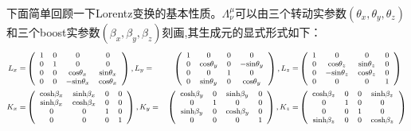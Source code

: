 下面简单回顾一下Lorentz变换的基本性质。$\Lambda^{\mu}_{\nu}$可以由三个转动实参数$(\theta_{x},\theta_{y},\theta_{z})$和三个boost实参数$(\beta_{x},\beta_{y},\beta_{z})$刻画,其生成元的显式形式如下：
\begin{equation}
\label{Lorentzgenerator}
\footnotesize
\begin{aligned}
L_{x}=&
\left(
    \begin{array}{cccc}
        1 &0 & 0& 0 \\
        0& 1 & 0& 0\\
       0 & 0& {\rm cos}\theta_{x} &{\rm sin}\theta_{x} \\
        0& 0& -{\rm sin}\theta_{x} &{\rm cos}\theta_{x}
    \end{array}
    \right)
    ,
    L_{y}=&
\left(
    \begin{array}{cccc}
        1 & 0&0 & 0 \\
        0& {\rm cos}\theta_{y}&0 & -{\rm sin}\theta_{y} \\
        0& 0& 1 &0  \\
        0 & {\rm sin}\theta_{y} &0& {\rm cos}\theta_{y}
    \end{array}
    \right)
    ,
   L_{z}=&
\left(
    \begin{array}{cccc}
        1 &0 & 0& 0 \\
       0 & {\rm cos}\theta_{z} &{\rm sin}\theta_{z}&0 \\
        0&  -{\rm sin}\theta_{z} &{\rm cos}\theta_{z} &0\\
        0& 0 & 0& 1\\
    \end{array}
    \right)  \\
    K_{x}=&
\left(
    \begin{array}{cccc}
       {\rm cosh }\beta_{x} & {\rm sinh }\beta_{x}& 0 &0 \\
        {\rm sinh }\beta_{x} & {\rm cosh }\beta_{x}& 0 &0 \\
        0 &0 & 1& 0 \\
         0& 0 & 0& 1
    \end{array}
    \right),
        K_{y}=&
\left(
    \begin{array}{cccc}
       {\rm cosh }\beta_{y} &0& {\rm sinh }\beta_{y} &0 \\
       0 &1 & 0& 0 \\
        {\rm sinh }\beta_{y} &0& {\rm cosh }\beta_{y} &0 \\
         0& 0 & 0& 1
    \end{array}
    \right),
    K_{z}=&
\left(
    \begin{array}{cccc}
       {\rm cosh }\beta_{z} & 0& 0 &{\rm sinh }\beta_{z} \\
        0& 1 & 0& 0\\
       0 &0 & 1& 0 \\
        {\rm sinh }\beta_{z} & 0& 0 &{\rm cosh }\beta_{z} \\
    \end{array}
    \right)
\end{aligned}
\end{equation}
